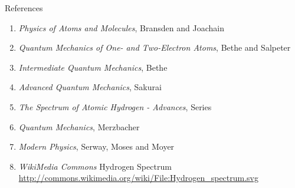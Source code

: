 \documentclass[aspectratio=1610,xcolor=dvipsnames,t]{beamer}
\begin{document}
    \begin{frame}{References} 
    \begin{enumerate}
        \item \emph{Physics of Atoms and Molecules}, Bransden and Joachain
        \item \emph{Quantum Mechanics of One- and Two-Electron Atoms},
                    Bethe and Salpeter
        \item \emph{Intermediate Quantum Mechanics}, Bethe
        \item \emph{Advanced Quantum Mechanics}, Sakurai
        \item \emph{The Spectrum of Atomic Hydrogen - Advances}, Series
        \item \emph{Quantum Mechanics}, Merzbacher
        \item \emph{Modern Physics}, Serway, Moses and Moyer
        \item \emph{WikiMedia Commons} Hydrogen Spectrum \\
            \url{http://commons.wikimedia.org/wiki/File:Hydrogen_spectrum.svg} 
    \end{enumerate}
    \end{frame} 
\end{document}
